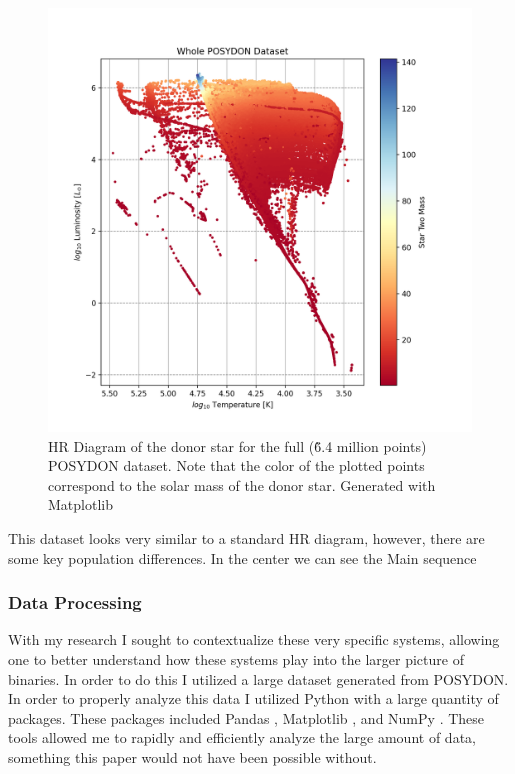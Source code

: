 \documentclass[12pt, a4paper]{article}
\begin{document}
        \begin{figure} [H]
            \centering
            \includegraphics[width = \textwidth]{figs/GeneratedFigs/WholePOSYDONDatasetExample.png}
            \caption{HR Diagram of the donor star for the full (\~6.4 million points) POSYDON dataset. Note that the color of the plotted points correspond to the solar mass of the donor star. Generated with Matplotlib}
            \label{EntireDataSetHR}
        \end{figure}

        This dataset looks very similar to a standard HR diagram, however, there are some key population differences. In the center we can see the Main sequence
        \subsubsection{Data Processing}
            With my research I sought to contextualize these very specific systems, allowing one to better understand how these systems play into the larger picture of binaries. In order to do this I utilized a large dataset generated from POSYDON. In order to properly analyze this data I utilized Python with a large quantity of packages. These packages included Pandas \parencite{reback2020pandas}, Matplotlib \parencite{Matplotlib}, and NumPy \parencite{harris2020array}. These tools allowed me to rapidly and efficiently analyze the large amount of data, something this paper would not have been possible without.
\end{document}
